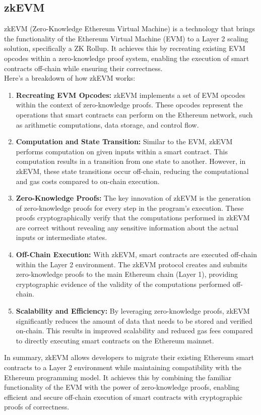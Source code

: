 \subsection{zkEVM}
zkEVM (Zero-Knowledge Ethereum Virtual Machine) is a technology that brings the functionality of the Ethereum Virtual Machine (EVM) to a Layer 2 scaling solution, specifically a ZK Rollup. It achieves this by recreating existing EVM opcodes within a zero-knowledge proof system, enabling the execution of smart contracts off-chain while ensuring their correctness.\\
Here's a breakdown of how zkEVM works:\\
\begin{enumerate}
	\item \textbf{Recreating EVM Opcodes:} zkEVM implements a set of EVM opcodes within the context of zero-knowledge proofs. These opcodes represent the operations that smart contracts can perform on the Ethereum network, such as arithmetic computations, data storage, and control flow.
	\item \textbf{Computation and State Transition:} Similar to the EVM, zkEVM performs computation on given inputs within a smart contract. This computation results in a transition from one state to another. However, in zkEVM, these state transitions occur off-chain, reducing the computational and gas costs compared to on-chain execution.
	\item \textbf{Zero-Knowledge Proofs:} The key innovation of zkEVM is the generation of zero-knowledge proofs for every step in the program's execution. These proofs cryptographically verify that the computations performed in zkEVM are correct without revealing any sensitive information about the actual inputs or intermediate states.
	\item \textbf{Off-Chain Execution:} With zkEVM, smart contracts are executed off-chain within the Layer 2 environment. The zkEVM protocol creates and submits zero-knowledge proofs to the main Ethereum chain (Layer 1), providing cryptographic evidence of the validity of the computations performed off-chain.
	\item \textbf{Scalability and Efficiency:} By leveraging zero-knowledge proofs, zkEVM significantly reduces the amount of data that needs to be stored and verified on-chain. This results in improved scalability and reduced gas fees compared to directly executing smart contracts on the Ethereum mainnet.
\end{enumerate}
In summary, zkEVM allows developers to migrate their existing Ethereum smart contracts to a Layer 2 environment while maintaining compatibility with the Ethereum programming model. It achieves this by combining the familiar functionality of the EVM with the power of zero-knowledge proofs, enabling efficient and secure off-chain execution of smart contracts with cryptographic proofs of correctness.
